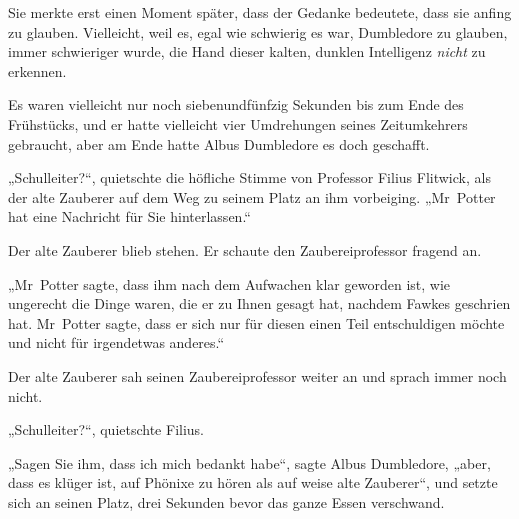 Sie merkte erst einen Moment später, dass der Gedanke bedeutete, dass sie anfing zu glauben. Vielleicht, weil es, egal wie schwierig es war, Dumbledore zu glauben, immer schwieriger wurde, die Hand dieser kalten, dunklen Intelligenz \emph{nicht} zu erkennen.


Es waren vielleicht nur noch siebenundfünfzig Sekunden bis zum Ende des Frühstücks, und er hatte vielleicht vier Umdrehungen seines Zeitumkehrers gebraucht, aber am Ende hatte Albus Dumbledore es doch geschafft.

„Schulleiter?“, quietschte die höfliche Stimme von Professor Filius Flitwick, als der alte Zauberer auf dem Weg zu seinem Platz an ihm vorbeiging. „Mr~Potter hat eine Nachricht für Sie hinterlassen.“

Der alte Zauberer blieb stehen. Er schaute den Zaubereiprofessor fragend an.

„Mr~Potter sagte, dass ihm nach dem Aufwachen klar geworden ist, wie ungerecht die Dinge waren, die er zu Ihnen gesagt hat, nachdem Fawkes geschrien hat. Mr~Potter sagte, dass er sich nur für diesen einen Teil entschuldigen möchte und nicht für irgendetwas anderes.“

Der alte Zauberer sah seinen Zaubereiprofessor weiter an und sprach immer noch nicht.

„Schulleiter?“, quietschte Filius.

„Sagen Sie ihm, dass ich mich bedankt habe“, sagte Albus Dumbledore, „aber, dass es klüger ist, auf Phönixe zu hören als auf weise alte Zauberer“, und setzte sich an seinen Platz, drei Sekunden bevor das ganze Essen verschwand.

